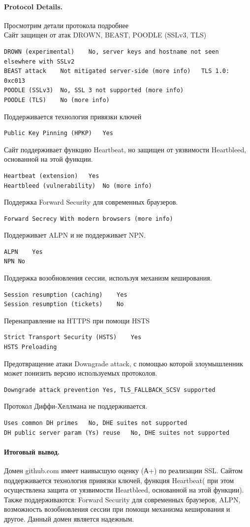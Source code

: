 \documentclass[10pt,a4paper]{report}
\begin{document}
\paragraph{Protocol Details.} Просмотрим детали протокола подробнее   \\
Сайт защищен от атак DROWN, BEAST, POODLE (SSLv3, TLS)
\begin{verbatim}
DROWN (experimental)	No, server keys and hostname not seen elsewhere with SSLv2
BEAST attack	Not mitigated server-side (more info)   TLS 1.0: 0xc013
POODLE (SSLv3)	No, SSL 3 not supported (more info)
POODLE (TLS)	No (more info)
\end{verbatim}
Поддерживается технология привязки ключей
\begin{verbatim}
Public Key Pinning (HPKP)	Yes
\end{verbatim}
Сайт поддерживает функцию Heartbeat, но защищен от уязвимости Heartbleed, основанной на этой функции.
\begin{verbatim}
Heartbeat (extension)	Yes
Heartbleed (vulnerability)	No (more info)
\end{verbatim}
Поддержка Forward Security для современных браузеров.
\begin{verbatim}
Forward Secrecy	With modern browsers (more info)
\end{verbatim}
Поддерживает ALPN и не поддерживает NPN.
\begin{verbatim}
ALPN	Yes
NPN	No
\end{verbatim}
Поддержка возобновления сессии, используя механизм кеширования.
\begin{verbatim}
Session resumption (caching)	Yes
Session resumption (tickets)	No
\end{verbatim}
Перенаправление на HTTPS при помощи HSTS
\begin{verbatim}
Strict Transport Security (HSTS)	Yes 
HSTS Preloading
\end{verbatim}
Предотвращение атаки Downgrade attack, с помощью которой злоумышленник может понизить версию используемых протоколов.
\begin{verbatim}
Downgrade attack prevention	Yes, TLS_FALLBACK_SCSV supported
\end{verbatim}
Протокол Диффи-Хеллмана не поддерживается.
\begin{verbatim}
Uses common DH primes	No, DHE suites not supported
DH public server param (Ys) reuse	No, DHE suites not supported
\end{verbatim}
\paragraph{Итоговый вывод.} Домен github.com имеет наивысшую оценку (А+) по реализации SSL. Сайтом поддерживается технология привязки ключей, функция Heartbeat( при этом осуществлена защита от уязвимости Heartbleed, основанной на этой функции). Также поддерживаются: Forward Security для современных браузеров, ALPN, возможность возобновления сессии при помощи механизма кеширования и другое. Данный домен является надежным.
\end{document}
